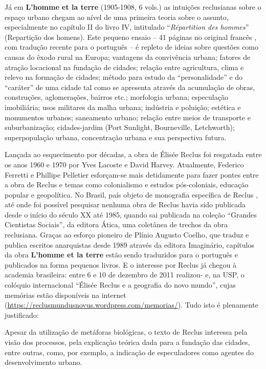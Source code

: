 Já em \textbf{L'homme et la terre} (1905-1908, 6 vols.) as intuições reclusianas sobre o espaço urbano chegam ao nível de uma primeira teoria sobre o assunto, especialmente no capítulo II do livro IV, intitulado ``\textit{Répartition des hommes}'' (Repartição dos homens). Este pequeno ensaio -- 41 páginas no original francês \cite[pp.~335-376]{RECLUS1905e}, com tradução recente para o português \cite{reclus_renovacao_2010} -- é repleto de ideias sobre questões como causas do êxodo rural na Europa; vantagens da convivência urbana; fatores de atração locacional na fundação de cidades; relação entre agricultura, clima e relevo na formação de cidades; método para estudo da ``personalidade'' e do ``caráter'' de uma cidade tal como se apresenta através da acumulação de obras, construções, aglomerações, bairros etc.; morfologia urbana; especulação imobiliária; usos militares da malha urbana; indústria e poluição; estética e monumentos urbanos; saneamento urbano; relação entre meios de transporte e suburbanização; cidades-jardim (Port Sunlight, Bourneville, Letchworth); superpopulação urbana, concentração urbana e sua perspectiva futura.

Lançada ao esquecimento por décadas, a obra de Élisée Reclus foi resgatada entre os anos 1960 e 1970 por Yves Lacoste e David Harvey. Atualmente, Federico Ferretti e Phillipe Pelletier esforçam-se mais detidamente para fazer pontes entre a obra de Reclus e temas como colonialismo e estudos pós-coloniais, educação popular e geopolítica. No Brasil, país objeto de monografia específica de Reclus \cite{RECLUS1900}, até onde foi possível pesquisar nenhuma obra de Reclus havia sido publicada desde o início do século XX até 1985, quando sai publicada na coleção ``Grandes Cientistas Sociais'', da editora Ática, uma coletânea de trechos da obra reclusiana. Graças ao esforço pioneiro de Plínio Augusto Coelho, que traduz e publica escritos anarquistas desde 1989 através da editora Imaginário, capítulos da obra \textbf{L'homme et la terre }estão sendo traduzidos para o português e publicados na forma pequenos livros. E o interesse por Reclus já chegou à academia brasileira: entre 6 e 10 de dezembro de 2011 realizou- e, na USP, o colóquio internacional ``Élisée Reclus e a geografia do novo mundo'', cujas memórias estão disponíveis na internet (\url{https://reclusmundusnovus.wordpress.com/memorias/}). Tudo isto é plenamente justificado:

\begin{citacao}
Apesar da utilização de metáforas biológicas, o texto de Reclus interessa pela visão dos processos, pela explicação teórica dada para a fundação das cidades, entre outras, como, por exemplo, a indicação de especuladores como agentes do desenvolvimento urbano. \cite[p.~65]{vasconcelos_dois_2012}
\end{citacao}

